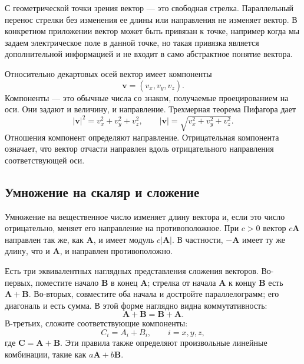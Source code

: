 С геометрической точки зрения вектор — это свободная стрелка. Параллельный перенос стрелки без изменения ее длины или направления не изменяет вектор. В конкретном приложении вектор может быть привязан к точке, например когда мы задаем электрическое поле в данной точке, но такая привязка является дополнительной информацией и не входит в само абстрактное понятие вектора.

Относительно декартовых осей вектор имеет компоненты
\begin{equation}
  \mathbf v=(v_x,v_y,v_z).
\end{equation}
Компоненты — это обычные числа со знаком, получаемые проецированием на оси. Они задают и величину, и направление. Трехмерная теорема Пифагора дает
\begin{equation}
  \lvert\mathbf v\rvert^2
  =v_x^2+v_y^2+v_z^2,
  \qquad
  \lvert\mathbf v\rvert
  =\sqrt{v_x^2+v_y^2+v_z^2}.
  \label{eq:vector-magnitude}
\end{equation}
Отношения компонент определяют направление. Отрицательная компонента означает, что вектор отчасти направлен вдоль отрицательного направления соответствующей оси.

\subsection{Умножение на скаляр и сложение}

Умножение на вещественное число изменяет длину вектора и, если это число отрицательно, меняет его направление на противоположное. При \(c>0\) вектор \(c\mathbf A\) направлен так же, как \(\mathbf A\), и имеет модуль \(c\lvert\mathbf A\rvert\). В частности, \(-\mathbf A\) имеет ту же длину, что и \(\mathbf A\), и направлен противоположно.

Есть три эквивалентных наглядных представления сложения векторов. Во-первых, поместите начало \(\mathbf B\) в конец \(\mathbf A\); стрелка от начала \(\mathbf A\) к концу \(\mathbf B\) есть \(\mathbf A+\mathbf B\). Во-вторых, совместите оба начала и достройте параллелограмм; его диагональ и есть сумма. В этой форме наглядно видна коммутативность:
\begin{equation}
  \mathbf A+\mathbf B=\mathbf B+\mathbf A.
\end{equation}
В-третьих, сложите соответствующие компоненты:
\begin{equation}
  C_i=A_i+B_i,
  \qquad i=x,y,z,
  \label{eq:component-addition}
\end{equation}
где \(\mathbf C=\mathbf A+\mathbf B\). Эти правила также определяют произвольные линейные комбинации, такие как \(a\mathbf A+b\mathbf B\).

